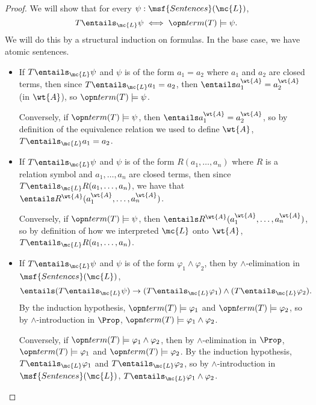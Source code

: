 \documentclass[11pt]{article}
\begin{document}
\begin{proof}
  We will show that for every $\psi : \msf{Sentences}(\mc{L})$,
$$
T \entails_{\mc{L}} \psi \iff \term(T) \models \psi.
$$
We will do this by a structural induction on formulas. In the base case, we have atomic sentences.

\begin{itemize}
\item If $T \entails_{\mc{L}} \psi$ and $\psi$ is of the form $a_1 = a_2$ where $a_1$ and $a_2$ are closed terms, then since $T \entails_{\mc{L}} a_1 = a_2$, then $\entails a_1^{\wt{A}} = a_2^{\wt{A}}$ (in $\wt{A}$), so $\term(T) \models \psi$.

   Conversely, if $\term(T) \models \psi$, then $\entails a_1^{\wt{A}} = a_2^{\wt{A}}$, so by definition of the equivalence relation we used to define $\wt{A}$, $T \entails_{\mc{L}} a_1 = a_2$.

\item If $T \entails_{\mc{L}} \psi$ and $\psi$ is of the form $R(a_1, \dots, a_n)$ where $R$ is a relation symbol and $a_1, \dots, a_n$ are closed terms, then since $T \entails_{\mc{L}} R(a_1, \dots, a_n)$, we have that $\entails R^{\wt{A}}(a_1^{\wt{A}}, \dots, a_n^{\wt{A}})$.

   Conversely, if $\term(T) \models \psi$, then $\entails R^{\wt{A}}(a_1^{\wt{A}}, \dots, a_n^{\wt{A}})$, so by definition of how we interpreted $\mc{L}$ onto $\wt{A}$, $T \entails_{\mc{L}} R(a_1, \dots, a_n)$.

\item If $T \entails_{\mc{L}} \psi$ and $\psi$ is of the form $\varphi_1 \wedge \varphi_2$, then by $\wedge$-elimination in $\msf{Sentences}(\mc{L})$, $$\entails (T \entails_{\mc{L}} \psi) \rightarrow (T \entails_{\mc{L}} \varphi_1) \wedge (T \entails_{\mc{L}} \varphi_2).$$ By the induction hypothesis, $\term(T) \models \varphi_1$ and $\term(T) \models \varphi_2$, so by $\wedge$-introduction in $\Prop$, $\term(T) \models \varphi_1 \wedge \varphi_2$.

   Conversely, if $\term(T) \models \varphi_1 \wedge \varphi_2$, then by $\wedge$-elimination in $\Prop$, $\term(T) \models \varphi_1$ and $\term(T) \models \varphi_2$. By the induction hypothesis, $T \entails_{\mc{L}} \varphi_1$ and $T \entails_{\mc{L}} \varphi_2$, so by $\wedge$-introduction in $\msf{Sentences}(\mc{L})$, $T \entails_{\mc{L}} \varphi_1 \wedge \varphi_2$.


\end{itemize}
\end{proof}
\end{document}
